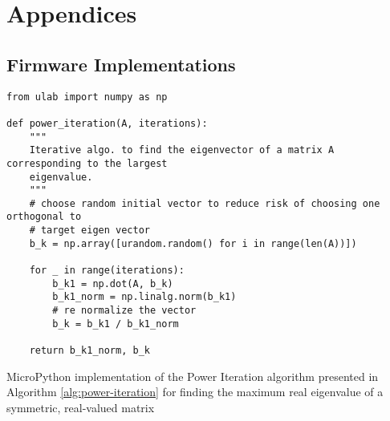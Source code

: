 \chapter{Appendices}
\label{chapter:appendices}

\graphicspath{ {report/Appendices/assets/} } 


\section{Firmware Implementations}
\label{app:firmware}

\begin{listing}[!htb]
\footnotesize
\begin{verbatim}
from ulab import numpy as np

def power_iteration(A, iterations):
    """
    Iterative algo. to find the eigenvector of a matrix A corresponding to the largest
    eigenvalue.
    """
    # choose random initial vector to reduce risk of choosing one orthogonal to 
    # target eigen vector
    b_k = np.array([urandom.random() for i in range(len(A))])

    for _ in range(iterations):
        b_k1 = np.dot(A, b_k)
        b_k1_norm = np.linalg.norm(b_k1)
        # re normalize the vector
        b_k = b_k1 / b_k1_norm

    return b_k1_norm, b_k

\end{verbatim}
\caption{MicroPython implementation of the Power Iteration algorithm presented in Algorithm \ref{alg:power-iteration} for finding the maximum real eigenvalue of a symmetric, real-valued matrix}
\label{app-listing:power-iteration-mpy}
\end{listing}

